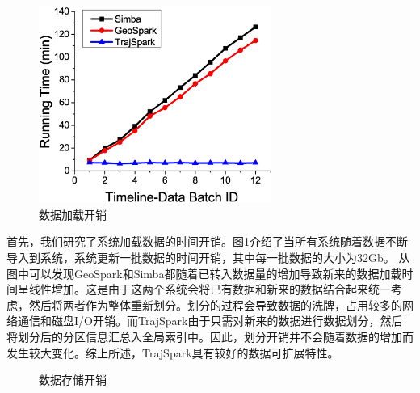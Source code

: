 	\begin{figure}[t]
	\centering
	\includegraphics[width=3in]{Fig/chapter3/loadfinal.eps}
	\caption{数据加载开销}
	\label{fig:loadtime}
\end{figure}

首先，我们研究了系统加载数据的时间开销。图\ref{fig:loadtime}介绍了当所有系统随着数据不断导入到系统，系统更新一批数据的时间开销，其中每一批数据的大小为32Gb。
从图中可以发现GeoSpark和Simba都随着已转入数据量的增加导致新来的数据加载时间呈线性增加。这是由于这两个系统会将已有数据和新来的数据结合起来统一考虑，然后将两者作为整体重新划分。划分的过程会导致数据的洗牌，占用较多的网络通信和磁盘I/O开销。而TrajSpark由于只需对新来的数据进行数据划分，然后将划分后的分区信息汇总入全局索引中。因此，划分开销并不会随着数据的增加而发生较大变化。综上所述，TrajSpark具有较好的数据可扩展特性。


 \begin{figure}[t]
	\centering
	\caption{数据存储开销}
	\label{fig:storage}
\end{figure}

